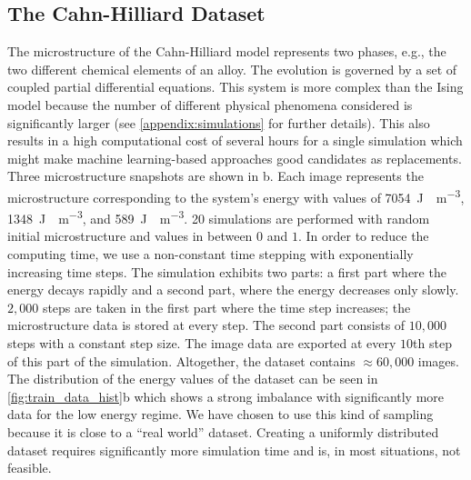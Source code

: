 \documentclass[11pt, authoryear]{elsarticle}
\begin{document}
	\subsection{The Cahn-Hilliard Dataset}
	The microstructure of the Cahn-Hilliard model represents two phases, e.g., 
	the two different chemical elements of an alloy. The evolution is governed
	by a set of coupled partial differential equations. This system is more complex 
	than the Ising model because the number of different physical phenomena 
	considered is significantly larger (see \ref{appendix:simulations} for further 
	details). This also results in a high computational cost of several hours for 
	a single simulation which might make machine learning-based approaches good	candidates as replacements.
	Three microstructure snapshots are shown in b. 
	Each image represents the microstructure corresponding to the system's energy
	with values of \SI{7054}{\J\mu \m^{-3}}, \SI{1348}{\J\mu \m^{-3}}, and 
	\SI{589}{\J\mu \m^{-3}}. 20 simulations are performed with random initial 
	microstructure and values in between $0$ and $1$. In order to reduce the 
	computing time, we use a non-constant time stepping with exponentially 
	increasing time steps. 
	The simulation exhibits two parts: a first part where the energy decays 
	rapidly and a second part, where the energy decreases only slowly. 
	$2,000$ steps are taken in the first part where the time step increases; 
	the microstructure data is stored at every step.
	The second part consists of $10,000$ steps with a constant step size. 
	The image data are exported at every $10$th step of this part of the simulation. 
	Altogether, the dataset contains $\approx 60,000$ images.
	The distribution of the energy values of the dataset can be seen in 
	\cref{fig:train_data_hist}b which shows a strong imbalance with significantly 
	more data for the low energy regime. We have chosen to use this kind of 
	sampling because it is close to a ``real world'' dataset. Creating 
	a uniformly distributed dataset requires significantly more simulation time
	and is, in most situations, not feasible.
	
	
\end{document}
